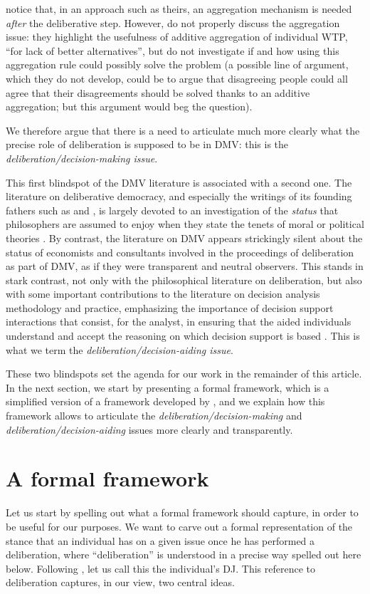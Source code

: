\documentclass[version=3.21, pagesize, twoside=off, bibliography=totoc, DIV=calc, fontsize=12pt, a4paper, french, english]{scrartcl}
\begin{document}
\citeauthor{bartkowski_beyond_2018} notice that, in an approach such as theirs, an aggregation mechanism is needed \emph{after} the deliberative step.
However, \citeauthor{bartkowski_beyond_2018} do not properly discuss the aggregation issue: they highlight the usefulness of additive aggregation of individual WTP, ``for lack of better alternatives'', but do not investigate if and how using this aggregation rule could possibly solve the problem (a possible line of argument, which they do not develop, could be to argue that disagreeing people could all agree that their disagreements should be solved thanks to an additive aggregation; but this argument would beg the question).

We therefore argue that there is a need to articulate much more clearly what the precise role of deliberation is supposed to be in DMV: this is the \emph{deliberation/decision-making issue}.

This first blindspot of the DMV literature is associated with a second one. The literature on deliberative democracy, and especially the writings of its founding fathers such as \citet{rawls_political_2005} and \citet{habermas_faktizitat_1992}, is largely devoted to an investigation of the \emph{status} that philosophers are assumed to enjoy when they state the tenets of moral or political theories \citep{meinard_du_2014}. 
By contrast, the literature on DMV appears strickingly silent about the status of economists and consultants involved in the proceedings of deliberation as part of DMV, as if they were transparent and neutral observers. 
This stands in stark contrast, not only with the philosophical literature on deliberation, but also with some important contributions to the literature on decision analysis methodology and practice, emphasizing the importance of decision support interactions that consist, for the analyst, in ensuring that the aided individuals understand and accept the reasoning on which decision support is based \citep{roy_multicriteria_1996}. 
This is what we term the \emph{deliberation/decision-aiding issue}.

These two blindspots set the agenda for our work in the remainder of this article. 
In the next section, we start by presenting a formal framework, which is a simplified version of a framework developed by \citet{cailloux_formal_2018}, and we explain how this framework allows to articulate the \emph{deliberation/decision-making} and \emph{deliberation/decision-aiding} issues more clearly and transparently.

\section{A formal framework}
Let us start by spelling out what a formal framework should capture, in order to be useful for our purposes. 
We want to carve out a formal representation of the stance that an individual has on a given issue once he has performed a deliberation, where “deliberation” is understood in a precise way spelled out here below. 
Following \citet{cailloux_formal_2018}, let us call this the individual's \ac{DJ}. 
This reference to deliberation captures, in our view, two central ideas.
\end{document}

